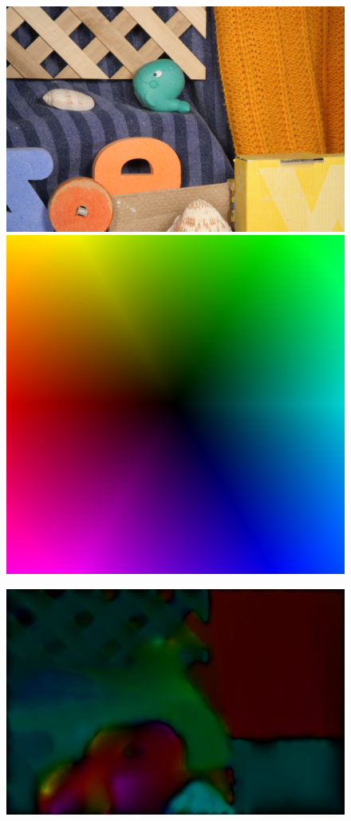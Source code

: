 \documentclass[10pt,twocolumn,letterpaper]{article}
\begin{document}
\begin{figure}

\includegraphics[width=0.6 \columnwidth] {frame10.png} 
\includegraphics[width=0.39 \columnwidth] {flow-color-key.png}

\includegraphics[width=\columnwidth]{10iter.png}


\end{figure}
\end{document}
